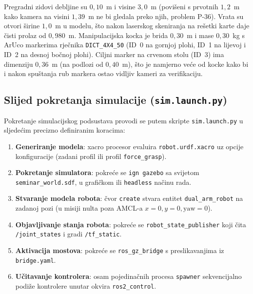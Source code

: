 Pregradni zidovi debljine su $0{,}10$~m i visine $3{,}0$~m (povišeni s prvotnih $1{,}2$~m kako
kamera na visini $1{,}39$~m ne bi gledala preko njih, problem P-36). Vrata su otvori širine $1{,}0$~m
u modelu, što nakon laserskog skeniranja na rešetki karte daje čisti prolaz od $0{,}980$~m.
Manipulacijska kocka je brida $0{,}30$~m i mase $0{,}30$~kg s ArUco markerima rječnika
\texttt{DICT\_4X4\_50} (ID~0 na gornjoj plohi, ID~1 na lijevoj i ID~2 na desnoj bočnoj plohi).
Ciljni marker na crvenom stolu (ID~3) ima dimenziju $0{,}36$~m (na podlozi od $0{,}40$~m), što je
namjerno veće od kocke kako bi i nakon spuštanja rub markera ostao vidljiv kameri za verifikaciju.


\subsection{Slijed pokretanja simulacije (\texttt{sim.launch.py})}
\label{sec:03-sim-launch}

Pokretanje simulacijskog podsustava provodi se putem skripte \texttt{sim.launch.py} u sljedećim
precizno definiranim koracima:
\begin{enumerate}
  \item \textbf{Generiranje modela}: xacro procesor evaluira \texttt{robot.urdf.xacro} uz opcije konfiguracije (zadani profil ili profil \texttt{force\_grasp}).
  \item \textbf{Pokretanje simulatora}: pokreće se \texttt{ign gazebo} sa svijetom \texttt{seminar\_world.sdf}, u grafičkom ili \texttt{headless} načinu rada.
  \item \textbf{Stvaranje modela robota}: čvor \texttt{create} stvara entitet \texttt{dual\_arm\_robot} na zadanoj pozi (u misiji nulta poza AMCL-a $x=0, y=0, \text{yaw}=0$).
  \item \textbf{Objavljivanje stanja robota}: pokreće se \texttt{robot\_state\_publisher} koji čita \texttt{/joint\_states} i gradi \texttt{/tf\_static}.
  \item \textbf{Aktivacija mostova}: pokreće se \texttt{ros\_gz\_bridge} s preslikavanjima iz \texttt{bridge.yaml}.
  \item \textbf{Učitavanje kontrolera}: osam pojedinačnih procesa \texttt{spawner} sekvencijalno podiže kontrolere unutar okvira \texttt{ros2\_control}.
\end{enumerate}
